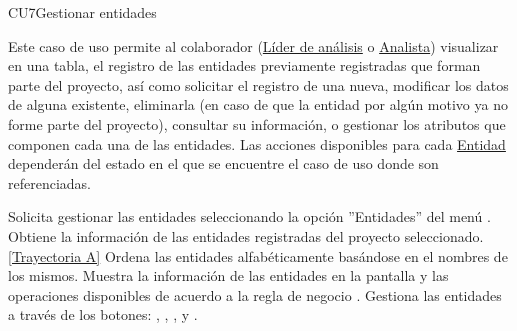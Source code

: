	\begin{UseCase}{CU7}{Gestionar entidades}{
			
		Este caso de uso permite al colaborador (\hyperlink{jefe}{Líder de análisis} o \hyperlink{analista}{Analista}) visualizar en una tabla, el registro de las entidades previamente registradas que forman parte del proyecto, así como solicitar el registro de una nueva, modificar los datos de alguna existente, eliminarla (en caso de que la entidad por algún motivo ya no forme parte del proyecto), consultar su información, o gestionar los atributos que componen cada una de las entidades.
     	Las acciones disponibles para cada \hyperlink{entidadEntidad}{Entidad} dependerán del estado en el que se encuentre el caso de uso donde son referenciadas.  
	}
	
\end{UseCase}
\begin{UCtrayectoria}
	\UCpaso[\UCactor] Solicita gestionar las entidades seleccionando la opción ''Entidades'' del menú .
	\UCpaso[\UCsist] Obtiene la información de las entidades registradas del proyecto seleccionado. \hyperlink{CU7:TAA}{[Trayectoria A]}
	\UCpaso[\UCsist] Ordena las entidades alfabéticamente basándose en el nombres de los mismos.
	\UCpaso[\UCsist] Muestra la información de las entidades en la pantalla  y las operaciones disponibles de acuerdo a la regla de negocio . \label{CU7-P4}
	\UCpaso[\UCactor] Gestiona las entidades a través de los botones: , \editar , \eliminar,  y . 
\end{UCtrayectoria}		
